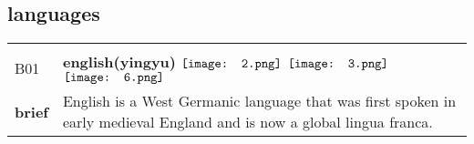 \documentclass[UTF8]{article}
\begin{document}
        \subsection{\Large languages}
    \vspace{-10pt}
            \begin{tabularx}{\textwidth}{p{1.5cm}X}
            \arrayrulecolor{myBlue}
        	\hline\\
            \small{B01}&
            \large{\bfseries{english(yingyu)}}\hfill
                                                            \phantom{$\vcenter{\hbox{\texttt{[image: 1.png]}}}$}
                                                                $\vcenter{\hbox{\texttt{[image: 2.png]}}}$
                                                                $\vcenter{\hbox{\texttt{[image: 3.png]}}}$
                                                                \phantom{$\vcenter{\hbox{\texttt{[image: 4.png]}}}$}
                                                                \phantom{$\vcenter{\hbox{\texttt{[image: 5.png]}}}$}
                                                                $\vcenter{\hbox{\texttt{[image: 6.png]}}}$
                                                                \phantom{$\vcenter{\hbox{\texttt{[image: 7.png]}}}$}
                                        \\[10pt]
            \large{\bfseries{brief}}&\noindent\parbox[c]{\hsize}{English is a West Germanic language that was first spoken in early medieval England and is now a global lingua franca.} \\[5pt]
            \hline\\[-10pt]
        \end{tabularx}
\end{document}
